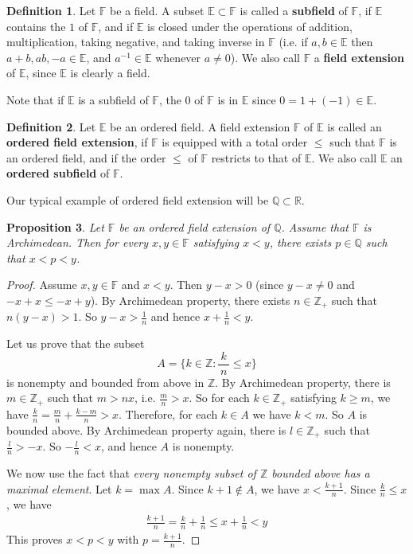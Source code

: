 \documentclass[12pt,b5paper,notitlepage]{article}
\theoremstyle{definition}
\newtheorem{df}{Definition}[section]
\theoremstyle{plain}
\newtheorem{pp}[df]{Proposition}
\newcommand{\Zbb}{\mathbb Z}
\newcommand{\Qbb}{\mathbb Q}
\newcommand{\Rbb}{\mathbb R}
\newcommand{\Ebb}{\mathbb E}
\newcommand{\Fbb}{\mathbb F}
\numberwithin{equation}{section}
\begin{document}
\begin{df}
Let $\Fbb$ be a field. A subset $\Ebb\subset\Fbb$ is called a  \textbf{subfield}  of $\Fbb$, if $\Ebb$ contains the $1$ of $\Fbb$, and if $\Ebb$ is closed under the operations of addition, multiplication, taking negative, and taking inverse in $\Fbb$ (i.e. if $a,b\in\Ebb$ then $a+b,ab,-a\in\Ebb$, and $a^{-1}\in\Ebb$ whenever $a\neq 0$). We also call $\Fbb$ a  \textbf{field extension} of $\Ebb$, since $\Ebb$ is clearly a field.
\end{df}

Note that if $\Ebb$ is a subfield of $\Fbb$, the $0$ of $\Fbb$ is in $\Ebb$ since $0=1+(-1)\in\Ebb$.

\begin{df}
Let $\Ebb$ be an ordered field. A field extension $\Fbb$ of $\Ebb$ is called an  \textbf{ordered field extension}, if $\Fbb$ is equipped with a total order $\leq$ such that $\Fbb$ is an ordered field, and if the order $\leq$ of $\Fbb$ restricts to that of $\Ebb$. We also call $\Ebb$ an \textbf{ordered subfield} of $\Fbb$.
\end{df}

Our typical example of ordered field extension will be $\Qbb\subset\Rbb$.

\begin{pp}\label{lb2}
Let $\Fbb$ be an ordered field extension  of $\Qbb$. Assume that $\Fbb$ is Archimedean. Then for every $x,y\in\Fbb$ satisfying $x<y$, there exists $p\in\Qbb$ such that $x<p<y$.
\end{pp}

\begin{proof}
Assume $x,y\in\Fbb$ and $x<y$. Then $y-x>0$ (since $y-x\neq 0$ and $-x+x\leq -x+y$). By Archimedean property, there exists $n\in\Zbb_+$ such that $n(y-x)>1$. So $\displaystyle y-x>\frac 1n$ and hence $\displaystyle x+\frac 1n<y$.

Let us prove that the subset
\begin{equation*}
A=\big\{k\in\Zbb: \frac {~k~}{n}\leq x\big\}
\end{equation*}
is nonempty and bounded from above in $\Zbb$. By Archimedean property, there is $m\in\Zbb_+$ such that $m>nx$, i.e. $\displaystyle \frac mn>x$. So for each $k\in\Zbb_+$ satisfying $k\geq m$, we have $\displaystyle \frac kn=\frac mn+\frac{k-m}n>x$. Therefore, for each $k\in A$ we have $k<m$. So $A$ is bounded above. By Archimedean property again, there is $l\in\Zbb_+$ such that $\displaystyle \frac ln>-x$. So $\displaystyle -\frac ln<x$, and hence $A$ is nonempty.

We now use the fact that \textit{every nonempty subset of $\Zbb$ bounded above has a maximal element}. Let $k=\max A$. Since $k+1\notin A$, we have $\displaystyle x<\frac{k+1}n$. Since $\displaystyle \frac kn\leq x$, we have
\begin{align*}
\frac{k+1}n=\frac kn+\frac 1n\leq x+\frac 1n<y
\end{align*}
This proves $x<p<y$ with $\displaystyle p=\frac{k+1}n$.
\end{proof}
\end{document}
